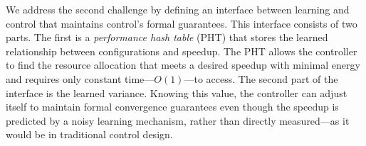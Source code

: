 {  We address the second challenge by defining an interface between
  learning and control that maintains control's formal guarantees.
  This interface consists of two parts.  The first is a
  \emph{performance hash table} (PHT) that stores the learned
  relationship between configurations and speedup.  The PHT allows the
  controller to find the resource allocation that meets a desired
  speedup with minimal energy and requires only constant
  time---$O(1)$---to access.  The second part of the interface is the
  learned variance.  Knowing this value, the controller can adjust
  itself to maintain formal convergence guarantees even though the
  speedup is predicted by a noisy learning mechanism, rather than
  directly measured---as it would be in traditional control
  design.
}

